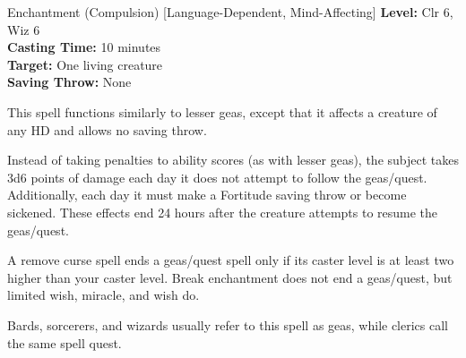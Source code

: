 {Enchantment (Compulsion) [Language-Dependent, Mind-Affecting]}
{
	\textbf{Level:}
	Clr 6, Wiz 6\\
	\textbf{Casting Time:}
	10 minutes\\
	\textbf{Target:}
	One living creature\\
	\textbf{Saving Throw:}
	None\\
}
{
	This spell functions similarly to lesser geas, except that it affects a creature of any HD and allows no saving throw.

	Instead of taking penalties to ability scores (as with lesser geas), the subject takes 3d6 points of damage each day it does not attempt to follow the geas/quest. Additionally, each day it must make a Fortitude saving throw or become sickened. These effects end 24 hours after the creature attempts to resume the geas/quest.

	A remove curse spell ends a geas/quest spell only if its caster level is at least two higher than your caster level. Break enchantment does not end a geas/quest, but limited wish, miracle, and wish do.

Bards, sorcerers, and wizards usually refer to this spell as geas, while clerics call the same spell quest.

}
